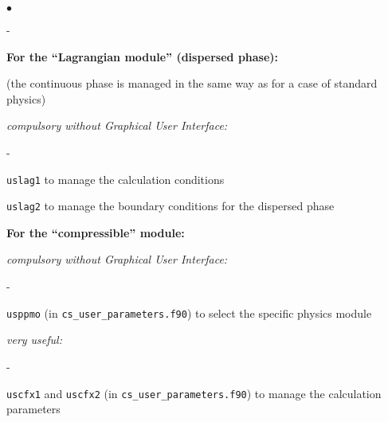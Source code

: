 {{{\begin{list}{$\bullet$}{}
\begin{list}{}{}
\begin{list}{}{}
\begin{list}{-}{}
        \end{list}
    \end{list}



    \item{\bf For the ``Lagrangian module'' (dispersed phase):}

(the continuous phase is managed in the same way as for a case of standard
physics)
    \begin{list}{}{}
        \item {\em compulsory without Graphical User Interface:}
        \begin{list}{-}{}
            \item \texttt{uslag1} to manage the calculation conditions

            \item \texttt{uslag2} to manage the boundary conditions for the
             dispersed phase

        \end{list}

    \end{list}

   \item {\bf For the ``compressible'' module:}

    \begin{list}{}{}
        \item {\em compulsory without Graphical User Interface:}
        \begin{list}{-}{}
            \item \texttt{usppmo} (in \texttt{cs\_user\_parameters.f90}) 
                  to select the specific physics module
        \end{list}
        \item {\em very useful:}
        \begin{list}{-}{}
            \item \texttt{uscfx1} and \texttt{uscfx2} (in \texttt{cs\_user\_parameters.f90}) 
                  to manage the calculation parameters


\end{list}
\end{list}
\end{list}
\end{list}}}}
